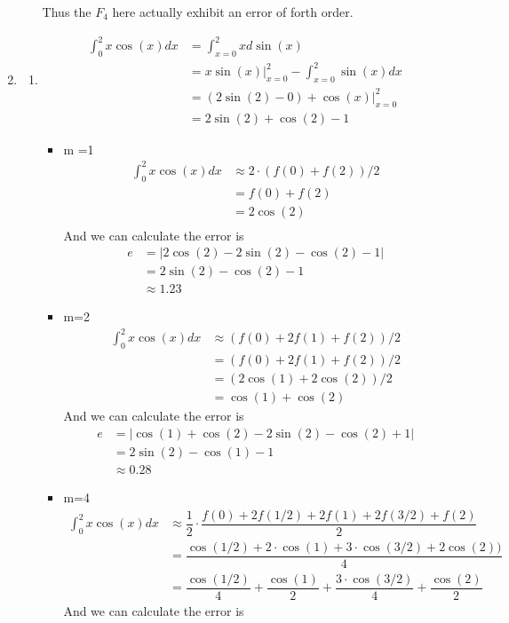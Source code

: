 \documentclass{article}
\begin{document}
\begin{enumerate}
\begin{enumerate}
  Thus the $F_4$ here actually exhibit an error of forth order.
\end{enumerate}
\item
\begin{enumerate}
\item
\begin{align*}
\int_0^2 x\cos(x) dx &= \int_{x=0}^2 x d\sin(x)\\
&= x\sin(x)|_{x=0}^2 -\int_{x=0}^2 \sin(x) dx\\
&=(2\sin(2)-0)+\cos(x)|_{x=0}^2\\
&=2\sin(2)+\cos(2)-1
\end{align*}
\begin{itemize}
\item  m =1
\begin{align*}
\int_{0}^2 x \cos(x) dx &\approx 2\cdot (f(0) +f(2)) /2\\
&=f(0)+f(2)\\
&=2\cos(2)\\
\end{align*}
And we can calculate the error is\begin{align*}
e &= |2\cos(2)-2\sin(2)-\cos(2)-1|\\
&= 2\sin(2) - \cos (2)-1\\
&\approx 1.23
\end{align*}
\item m=2
\begin{align*}
\int_{0}^2 x \cos(x) dx &\approx  (f(0) +2f(1)+f(2))/2\\
&=(f(0)+2f(1)+f(2))/2\\
&=(2\cos(1)+2\cos(2))/2\\
&=\cos(1)+\cos(2)
\end{align*}
And we can calculate the error is\begin{align*}
e &= |\cos(1)+\cos(2)-2\sin(2)-\cos(2)+1|\\
&= 2\sin(2) - \cos (1)-1\\
&\approx 0.28
\end{align*}
\item  m=4
\begin{align*}
\int_0^2 x\cos(x) dx &\approx \dfrac{1}{2}\cdot \dfrac{f(0)+2f(1/2)+2f(1)+2f(3/2)+f(2)}{2}\\
&=\dfrac{ \cos(1/2)+2\cdot \cos(1)+3\cdot \cos(3/2)+2\cos(2))}{4}\\
&=\dfrac{\cos(1/2)}{4}+\dfrac{\cos(1)}{2}+\dfrac{3\cdot \cos(3/2)}{4}+\dfrac{\cos(2)}{2}
\end{align*}
And we can calculate the error is\begin{align*}

\end{align*}
\end{itemize}
\end{enumerate}
\end{enumerate}
\end{document}
